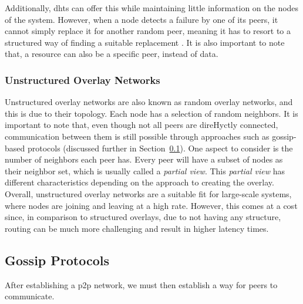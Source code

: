 Additionally, \glspl{dht} can offer this while maintaining little information on the nodes of the system. However, when a node detects a failure by one of its peers, it cannot simply replace it for another random peer, meaning it has to resort to a structured way of finding a suitable replacement \cite{Leitao2010}. It is also important to note that, a resource can also be a specific peer, instead of data.

\subsubsection*{Unstructured Overlay Networks}
\label{sssec:unstructured_overlay_networks}

Unstructured overlay networks are also known as random overlay networks, and this is due to their topology. Each node has a selection of random neighbors. It is important to note that, even though not all peers are direHyctly connected, communication between them is still possible through approaches such as gossip-based protocols (discussed further in Section~\ref{ssec:gossip_protocols}). One aspect to consider is the number of neighbors each peer has. Every peer will have a subset of nodes as their neighbor set, which is usually called a \textit{partial view}. This \textit{partial view} has different characteristics depending on the approach to creating the overlay. Overall, unstructured overlay networks are a suitable fit for large-scale systems, where nodes are joining and leaving at a high rate. However, this comes at a cost since, in comparison to structured overlays, due to not having any structure, routing can be much more challenging and result in higher latency times\cite{EngKeongLua2005}.

\subsection{Gossip Protocols}
\label{ssec:gossip_protocols}

After establishing a \gls{p2p} network, we must then establish a way for peers to communicate.


